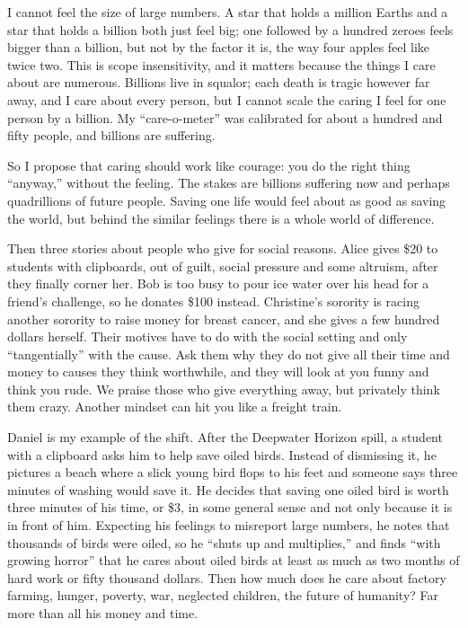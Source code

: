 
I cannot feel the size of large numbers. A star that holds a million Earths and a star that holds a billion both just feel big; one followed by a hundred zeroes feels bigger than a billion, but not by the factor it is, the way four apples feel like twice two. This is scope insensitivity, and it matters because the things I care about are numerous. Billions live in squalor; each death is tragic however far away, and I care about every person, but I cannot scale the caring I feel for one person by a billion. My ``care-o-meter'' was calibrated for about a hundred and fifty people, and billions are suffering.

So I propose that caring should work like courage: you do the right thing ``anyway,'' without the feeling. The stakes are billions suffering now and perhaps quadrillions of future people. Saving one life would feel about as good as saving the world, but behind the similar feelings there is a whole world of difference.

Then three stories about people who give for social reasons. Alice gives \$20 to students with clipboards, out of guilt, social pressure and some altruism, after they finally corner her. Bob is too busy to pour ice water over his head for a friend's challenge, so he donates \$100 instead. Christine's sorority is racing another sorority to raise money for breast cancer, and she gives a few hundred dollars herself. Their motives have to do with the social setting and only ``tangentially'' with the cause. Ask them why they do not give all their time and money to causes they think worthwhile, and they will look at you funny and think you rude. We praise those who give everything away, but privately think them crazy. Another mindset can hit you like a freight train.

Daniel is my example of the shift. After the Deepwater Horizon spill, a student with a clipboard asks him to help save oiled birds. Instead of dismissing it, he pictures a beach where a slick young bird flops to his feet and someone says three minutes of washing would save it. He decides that saving one oiled bird is worth three minutes of his time, or \$3, in some general sense and not only because it is in front of him. Expecting his feelings to misreport large numbers, he notes that thousands of birds were oiled, so he ``shuts up and multiplies,'' and finds ``with growing horror'' that he cares about oiled birds at least as much as two months of hard work or fifty thousand dollars. Then how much does he care about factory farming, hunger, poverty, war, neglected children, the future of humanity? Far more than all his money and time. 

